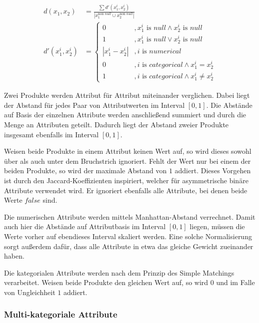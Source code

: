 \begin{align}
    d(x_1, x_2) &= \frac{\sum d'(x_1^i, x_2^i)}{|x_1^{\text{non }null} \cup x_2^{\text{non }null}|} \\
    d'(x_1^i, x_2^i) &= \begin{cases}
        0 &, x_1^i \text{ is } null \wedge x_2^i \text{ is } null \\
        1 &, x_1^i \text{ is } null \vee x_2^i \text{ is } null \\
        |x_1^i - x_2^i| &, i \text{ is } numerical \\
        0 &, i \text{ is } categorical \wedge x_1^i = x_2^i \\
        1 &, i \text{ is } categorical \wedge x_1^i \neq x_2^i
    \end{cases}
\end{align}

Zwei Produkte werden Attribut für Attribut miteinander verglichen. Dabei
liegt der Abstand für jedes Paar von Attributwerten im Interval
\([0,1]\). Die Abstände auf Basis der einzelnen Attribute werden
anschließend summiert und durch die Menge an Attributen geteilt. Dadurch
liegt der Abstand zweier Produkte insgesamt ebenfalls im Interval
\([0,1]\).

Weisen beide Produkte in einem Attribut keinen Wert auf, so wird dieses
sowohl über als auch unter dem Bruchstrich ignoriert. Fehlt der Wert nur
bei einem der beiden Produkte, so wird der maximale Abstand von \(1\)
addiert. Dieses Vorgehen ist durch den Jaccard-Koeffizienten inspiriert,
welcher für asymmetrische binäre Attribute verwendet wird. Er ignoriert
ebenfalls alle Attribute, bei denen beide Werte \(false\) sind.
\autocite[siehe][Kap. 1.2.4 Binary Variables]{kaufman2009}

Die numerischen Attribute werden mittels Manhattan-Abstand verrechnet.
Damit auch hier die Abstände auf Attributbasis im Interval \([0,1]\)
liegen, müssen die Werte vorher auf ebendieses Interval skaliert werden.
Eine solche Normalisierung sorgt außerdem dafür, dass alle Attribute in
etwa das gleiche Gewicht zueinander haben. \autocite[Kap. 1.2.1
Interval-Scaled Variables]{kaufman2009}

Die kategorialen Attribute werden nach dem Prinzip des Simple Matchings
verarbeitet. Weisen beide Produkte den gleichen Wert auf, so wird \(0\)
und im Falle von Ungleichheit \(1\) addiert.

\hypertarget{multi-kategoriale-attribute}{%
\subsubsection{Multi-kategoriale
Attribute}\label{multi-kategoriale-attribute}}

